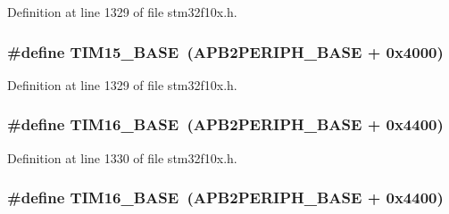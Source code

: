 Definition at line 1329 of file stm32f10x.\+h.

\subsubsection[{\texorpdfstring{T\+I\+M15\+\_\+\+B\+A\+SE}{TIM15_BASE}}]{\setlength{\rightskip}{0pt plus 5cm}\#define T\+I\+M15\+\_\+\+B\+A\+SE~({\bf A\+P\+B2\+P\+E\+R\+I\+P\+H\+\_\+\+B\+A\+SE} + 0x4000)}\hypertarget{group___peripheral__memory__map_ga7ab42ce1846930569d742d339b554078}{}\label{group___peripheral__memory__map_ga7ab42ce1846930569d742d339b554078}


Definition at line 1329 of file stm32f10x.\+h.

\subsubsection[{\texorpdfstring{T\+I\+M16\+\_\+\+B\+A\+SE}{TIM16_BASE}}]{\setlength{\rightskip}{0pt plus 5cm}\#define T\+I\+M16\+\_\+\+B\+A\+SE~({\bf A\+P\+B2\+P\+E\+R\+I\+P\+H\+\_\+\+B\+A\+SE} + 0x4400)}\hypertarget{group___peripheral__memory__map_ga16c97093a531d763b0794c3e6d09e1bf}{}\label{group___peripheral__memory__map_ga16c97093a531d763b0794c3e6d09e1bf}


Definition at line 1330 of file stm32f10x.\+h.

\subsubsection[{\texorpdfstring{T\+I\+M16\+\_\+\+B\+A\+SE}{TIM16_BASE}}]{\setlength{\rightskip}{0pt plus 5cm}\#define T\+I\+M16\+\_\+\+B\+A\+SE~({\bf A\+P\+B2\+P\+E\+R\+I\+P\+H\+\_\+\+B\+A\+SE} + 0x4400)}\hypertarget{group___peripheral__memory__map_ga16c97093a531d763b0794c3e6d09e1bf}{}\label{group___peripheral__memory__map_ga16c97093a531d763b0794c3e6d09e1bf}


